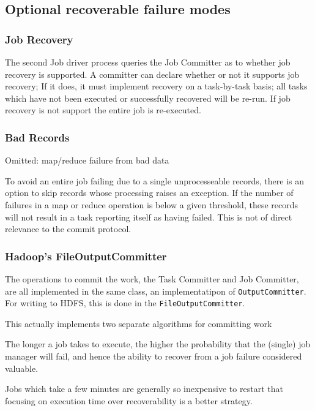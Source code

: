 \documentclass[conference]{IEEEtran}
\begin{document}

\subsection{Optional recoverable failure modes}
\label{subsec:optionalRecoverableFailureModes}

\subsubsection{Job Recovery}
The second Job driver process queries the Job Committer as to whether job
recovery is supported.
A committer can declare whether or not it supports job recovery;
If it does, it must implement recovery on a task-by-task basis;
all tasks which have not been executed or successfully recovered will be
re-run.
If job recovery is not support the entire job is re-executed.

\subsubsection{Bad Records}

Omitted: map/reduce failure from bad data

To avoid an entire job failing due to a single unprocesseable records,
there is an option to skip records whose processing raises an exception.
If the number of failures in a map or reduce operation is below a given
threshold, these records will not result in a task reporting itself as
having failed.
This is not of direct relevance to the commit protocol.


\subsubsection{Hadoop's FileOutputCommitter}

The operations to commit the work, the Task Committer and Job Committer,
are all implemented in the same class, an implementatipon of \texttt{OutputCommitter}.
For writing to HDFS, this is done in the \texttt{FileOutputCommitter}.

This actually implements two separate algorithms for committing work

The longer a job takes to execute, the higher the probability that the (single)
job manager will fail, and hence the ability to recover from a job failure
considered valuable.


Jobs which take a few minutes are generally so inexpensive to
restart that focusing on execution time over recoverability is a better strategy.
\end{document}
